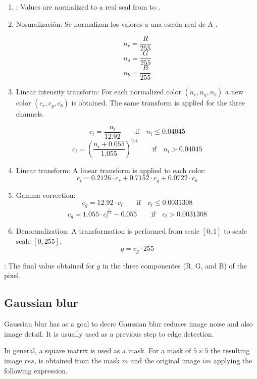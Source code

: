 \begin{enumerate}

\item {}: Values are normalized to a real scal from  to .

\item Normalización: Se normalizan los valores a una escala real de  A .

\[
n_r = \frac{R}{255}
\]
\[
n_g = \frac{G}{255}
\]
\[
n_b = \frac{B}{255}
\]

\item Linear intensity transform:
For each normalized color
$(n_r, n_g, n_b)$ a new color $(c_r, c_g, c_b)$ is obtained.
The same transform is applied for the three channels.

\[
c_i = \frac{n_i}{12.92} \quad\quad \text{if} \quad n_i \leq 0.04045
\]
\[
c_i = \left(\frac{n_i + 0.055}{1.055}\right)^{2.4} \quad\quad \text{if} \quad n_i > 0.04045
\]

\item Linear transform:
A linear transform is applied to each color:
\[
c_l = 0.2126 \cdot c_r + 0.7152 \cdot c_g + 0.0722 \cdot c_b
\]

\item Gamma correction: 
\[
c_g = 12.92 \cdot c_l \quad\quad \text{if} \quad c_l \leq 0.0031308
\]
\[
c_g = 1.055 \cdot c_l^{\frac{1}{2.4}} - 0.055 \quad\quad \text{if} \quad c_l > 0.0031308
\]

\item Denormalization: A transformation is performed from scale $[0,1]$ to scale scale $[0,255]$.
\[
g = c_g \cdot 255
\]

\end{enumerate}

:
The final value obtained for $g$ in the three componentes (R, G, and B) of the pixel.

\subsection{Gaussian blur}

Gaussian blur has as a goal to decre
Gaussian blur reduces image noise and also image detail. It is usually
used as a previous step to edge detection.

In general, a square matrix is used as a mask.
For a mask of $5 \times 5$ the resulting image $res$, is obtained
from the mask $m$ and the original image $im$ applying the following
expression.


